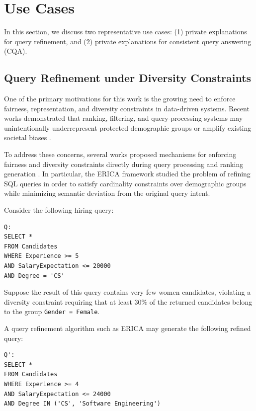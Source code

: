 
\section{Use Cases}
\label{sec:usecases}

In this section, we discuss two representative use cases:
(1) private explanations for query refinement, and
(2) private explanations for consistent query answering (CQA).

\subsection{Query Refinement under Diversity Constraints}

One of the primary motivations for this work is the growing need to enforce fairness,
representation, and diversity constraints in data-driven systems.
Recent works demonstrated that ranking, filtering, and query-processing systems
may unintentionally underrepresent protected demographic groups
or amplify existing societal biases \cite{barocas-hardt-narayanan,impossibilityfairness,SYJ18}.

To address these concerns, several works proposed mechanisms for enforcing fairness
and diversity constraints directly during query processing and ranking generation
\cite{SYJ18,ERICA}.
In particular, the \textsc{ERICA} framework \cite{ERICA}
studied the problem of refining SQL queries in order to satisfy
cardinality constraints over demographic groups while minimizing
semantic deviation from the original query intent.

Consider the following hiring query:

\begin{verbatim}
Q:
SELECT *
FROM Candidates
WHERE Experience >= 5
AND SalaryExpectation <= 20000
AND Degree = 'CS'
\end{verbatim}

Suppose the result of this query contains very few women candidates,
violating a diversity constraint requiring that at least $30\%$
of the returned candidates belong to the group
\texttt{Gender = Female}.

A query refinement algorithm such as \textsc{ERICA} may generate
the following refined query:

\begin{verbatim}
Q':
SELECT *
FROM Candidates
WHERE Experience >= 4
AND SalaryExpectation <= 24000
AND Degree IN ('CS', 'Software Engineering')
\end{verbatim}

